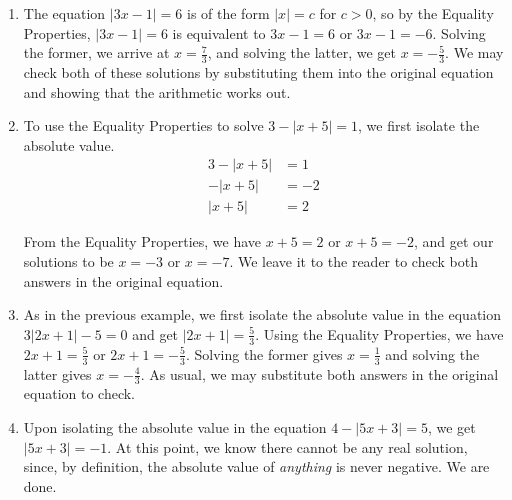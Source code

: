 \medskip


{
\begin{enumerate}

\item  The equation  $|3x-1| = 6$ is of the form $|x| = c$ for $c>0$, so by the Equality Properties, $|3x-1| = 6$ is equivalent to $3x-1=6$ or $3x-1 = -6$.  Solving the former, we arrive at $x = \frac{7}{3}$, and solving the latter, we get $x = -\frac{5}{3}$.  We may check both of these solutions by substituting them into the original equation and showing that the arithmetic works out.

\item  To use the Equality Properties to solve $3 - |x+5| = 1$, we first isolate the absolute value. 
\begin{align*}
3 - |x+5| & =  1 \\
-|x+5| & =  -2  \tag*{subtract $3$} \\
|x+5| & =  2 \tag*{divide by $-1$}  
\end{align*}

From the Equality Properties, we have $x+5 = 2$ or $x+5 = -2$, and get our solutions to be $x = -3$ or $x = -7$.  We leave it to the reader to check both answers in the original equation.

\item As in the previous example, we first isolate the absolute value in the equation $3|2x+1| - 5 = 0$ and get $|2x+1| = \frac{5}{3}$.  Using the Equality Properties, we have $2x+1 = \frac{5}{3}$ or $2x+1 = -\frac{5}{3}$.  Solving the former gives $x = \frac{1}{3}$ and solving the latter gives $x = -\frac{4}{3}$.  As usual, we may substitute both answers in the original equation to check.

\item  Upon isolating the absolute value in the equation $4 - |5x+3| = 5$, we get $|5x+3| = -1$.  At this point, we know there cannot be any real solution, since, by definition, the absolute value of \textit{anything} is never negative.  We are done. 
\end{enumerate}
\enlargethispage{\baselineskip}}

